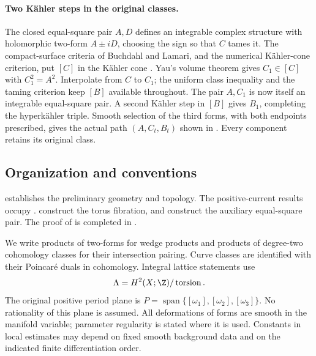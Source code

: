 \paragraph{Two K\"ahler steps in the original classes.}
The closed equal-square pair $A,D$ defines an integrable complex
structure with holomorphic two-form $A\pm iD$, choosing the sign
so that $C$ tames it. The compact-surface
criteria of Buchdahl and Lamari, and the numerical K\"ahler-cone
criterion, put $[C]$ in the K\"ahler cone
\cite{Buchdahl1999,Lamari1999,DemaillyPaun2004}.
Yau's volume theorem \cite{Yau1978} gives $C_1\in[C]$ with
$C_1^2=A^2$. Interpolate from $C$ to $C_1$; the uniform class
inequality and the taming criterion keep $[B]$ available throughout.
The pair $A,C_1$ is now itself an integrable equal-square pair.
A second K\"ahler step in $[B]$ gives $B_1$, completing the
hyperk\"ahler triple. Smooth selection of the third forms, with both
endpoints prescribed, gives the actual path $(A,C_t,B_t)$ shown in
. Every component retains its original class.

\subsection{Organization and conventions}

 establishes the preliminary geometry and
topology. The positive-current results occupy
.
 construct the
torus fibration, and
construct the auxiliary equal-square pair. The proof of
 is completed in .

We write products of two-forms for wedge products and products of
degree-two cohomology classes for their intersection pairing.
Curve classes are identified with their Poincar\'e duals in cohomology.
Integral lattice statements use
\[
 \Lambda=H^2(X;\Z)/\operatorname{torsion}.
\]
The original positive period plane is
$P=\operatorname{span}\{[\omega_1],[\omega_2],[\omega_3]\}$.
No rationality of this plane is assumed. All deformations of forms are
smooth in the manifold variable; parameter regularity is stated where
it is used. Constants in local estimates may depend on fixed smooth
background data and on the indicated finite differentiation order.
